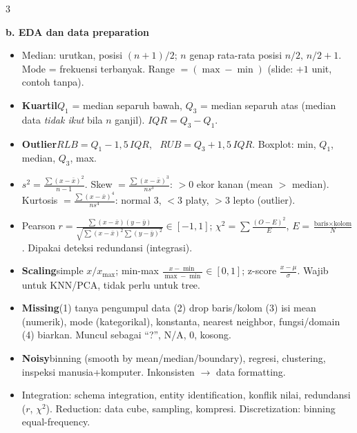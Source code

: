 \documentclass[8pt]{extarticle}
\newcommand{\sect}[1]{\par\vspace{1.5pt}\colorbox{black!12}{\parbox{\dimexpr\columnwidth-2\fboxsep}{\textbf{#1}}}\par\vspace{0.8pt}}
\newcommand{\sub}[1]{\textbf{#1}\;}
\begin{document}
\begin{multicols*}{3}
\sect{b. EDA dan data preparation}
\begin{itemize}
\item Median: urutkan, posisi $(n{+}1)/2$; $n$ genap rata-rata posisi $n/2,\,n/2{+}1$. Mode = frekuensi terbanyak. Range $=(\max-\min)$ (slide: $+1$ unit, contoh tanpa).
\item \sub{Kuartil}$Q_1$ = median separuh bawah, $Q_3$ = median separuh atas (median data \emph{tidak ikut} bila $n$ ganjil). $IQR=Q_3-Q_1$.
\item \sub{Outlier}$RLB=Q_1-1{,}5\,IQR$, \ $RUB=Q_3+1{,}5\,IQR$. Boxplot: min, $Q_1$, median, $Q_3$, max.
\item $s^2=\frac{\sum(x-\bar x)^2}{n-1}$. Skew $=\frac{\sum(x-\bar x)^3}{ns^3}$: $>0$ ekor kanan (mean $>$ median). Kurtosis $=\frac{\sum(x-\bar x)^4}{ns^4}$: normal 3, $<3$ platy, $>3$ lepto (outlier).
\item Pearson $r=\frac{\sum(x-\bar x)(y-\bar y)}{\sqrt{\sum(x-\bar x)^2\sum(y-\bar y)^2}}\in[-1,1]$; $\chi^2=\sum\frac{(O-E)^2}{E}$, $E=\frac{\text{baris}\times\text{kolom}}{N}$. Dipakai deteksi redundansi (integrasi).
\item \sub{Scaling}simple $x/x_{\max}$; min-max $\frac{x-\min}{\max-\min}\in[0,1]$; z-score $\frac{x-\mu}{\sigma}$. Wajib untuk KNN/PCA, tidak perlu untuk tree.
\item \sub{Missing}(1) tanya pengumpul data (2) drop baris/kolom (3) isi mean (numerik), mode (kategorikal), konstanta, nearest neighbor, fungsi/domain (4) biarkan. Muncul sebagai ``?'', N/A, 0, kosong.
\item \sub{Noisy}binning (smooth by mean/median/boundary), regresi, clustering, inspeksi manusia+komputer. Inkonsisten $\to$ data formatting.
\item Integration: schema integration, entity identification, konflik nilai, redundansi ($r$, $\chi^2$). Reduction: data cube, sampling, kompresi. Discretization: binning equal-frequency.
\end{itemize}


\end{multicols*}
\end{document}
